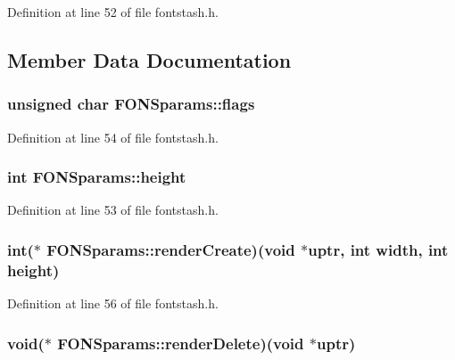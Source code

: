 Definition at line 52 of file fontstash.\+h.



\subsection{Member Data Documentation}
\hypertarget{struct_f_o_n_sparams_a1fedd9cf05c88dc089a76e4a94f4dec0}{
\subsubsection[{flags}]{\setlength{\rightskip}{0pt plus 5cm}unsigned char F\+O\+N\+Sparams\+::flags}}\label{struct_f_o_n_sparams_a1fedd9cf05c88dc089a76e4a94f4dec0}


Definition at line 54 of file fontstash.\+h.

\hypertarget{struct_f_o_n_sparams_a938b4ebdbc1734625b57f801b830758b}{
\subsubsection[{height}]{\setlength{\rightskip}{0pt plus 5cm}int F\+O\+N\+Sparams\+::height}}\label{struct_f_o_n_sparams_a938b4ebdbc1734625b57f801b830758b}


Definition at line 53 of file fontstash.\+h.

\hypertarget{struct_f_o_n_sparams_a92d9a5443b3694c2a698e12a41720616}{
\subsubsection[{render\+Create}]{\setlength{\rightskip}{0pt plus 5cm}int($\ast$ F\+O\+N\+Sparams\+::render\+Create)(void $\ast$uptr, int {\bf width}, int {\bf height})}}\label{struct_f_o_n_sparams_a92d9a5443b3694c2a698e12a41720616}


Definition at line 56 of file fontstash.\+h.

\hypertarget{struct_f_o_n_sparams_ac375908ec6a8963c5893c0066df4d157}{
\subsubsection[{render\+Delete}]{\setlength{\rightskip}{0pt plus 5cm}void($\ast$ F\+O\+N\+Sparams\+::render\+Delete)(void $\ast$uptr)}}\label{struct_f_o_n_sparams_ac375908ec6a8963c5893c0066df4d157}


